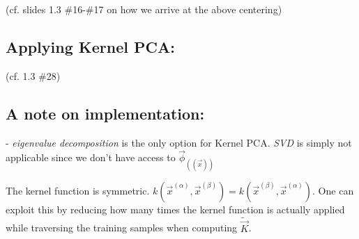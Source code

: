 (cf. slides 1.3 \#16-\#17 on how we arrive at the above centering)

\subsection{Applying Kernel PCA:}



(cf. 1.3 \#28)

\subsection{A note on implementation:}


- \emph{eigenvalue decomposition} is the only option for Kernel PCA. \emph{SVD} is simply not applicable since we don't have access to $\vec \phi_((\vec x))$

The kernel function is symmetric. $k(\vec x^{(\alpha)}, \vec x^{(\beta)}) = k(\vec x^{(\beta)}, \vec x^{(\alpha)})$. One can exploit this by reducing how many times the kernel function is actually applied while traversing the training samples when computing $\widetilde {\vec{K}}$.
